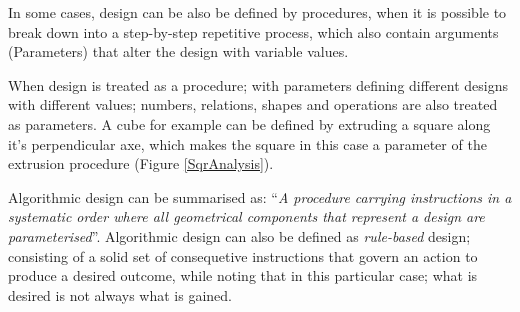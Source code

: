 In some cases, design can be also be defined by procedures, when it is possible to break down into a
step-by-step repetitive process, which also contain arguments (Parameters) that alter the design
with variable values.

When design is treated as a procedure; with parameters defining different designs with different
values; numbers, relations, shapes and operations are also treated as parameters. A cube for example
can be defined by extruding a square along it's perpendicular axe, which makes the square in this
case a parameter of the extrusion procedure (Figure \ref{SqrAnalysis}).

Algorithmic design can be summarised as: ``\emph{A procedure carrying instructions in a systematic
order where all geometrical components that represent a design are
parameterised}''\cite{hernandez06}. Algorithmic design can also be defined as \emph{rule-based}
design; consisting of a solid set of consequetive instructions that govern an action
to produce a desired outcome, while noting that in this particular case; what is desired is not
always what is gained.